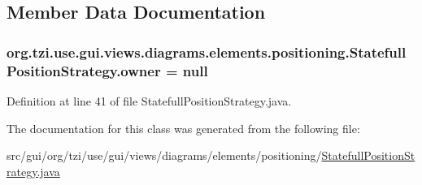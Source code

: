\subsection{Member Data Documentation}
\hypertarget{classorg_1_1tzi_1_1use_1_1gui_1_1views_1_1diagrams_1_1elements_1_1positioning_1_1_statefull_position_strategy_ac987ea0c7e5b6ddc09cc5afb41043dfd}{
\subsubsection[{owner}]{ org.\-tzi.\-use.\-gui.\-views.\-diagrams.\-elements.\-positioning.\-Statefull\-Position\-Strategy.\-owner = null\hspace{0.3cm}{\ttfamily [protected]}}}\label{classorg_1_1tzi_1_1use_1_1gui_1_1views_1_1diagrams_1_1elements_1_1positioning_1_1_statefull_position_strategy_ac987ea0c7e5b6ddc09cc5afb41043dfd}


Definition at line 41 of file Statefull\-Position\-Strategy.\-java.



The documentation for this class was generated from the following file\-:\begin{DoxyCompactItemize}
\item 
src/gui/org/tzi/use/gui/views/diagrams/elements/positioning/\hyperlink{_statefull_position_strategy_8java}{Statefull\-Position\-Strategy.\-java}\end{DoxyCompactItemize}
